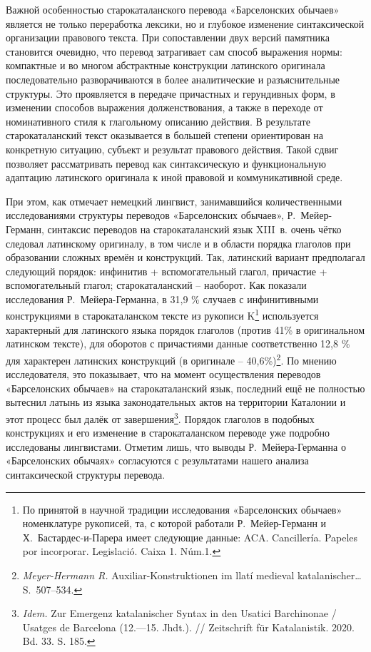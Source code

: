 Важной особенностью старокаталанского перевода «Барселонских обычаев» является не только переработка лексики, но и глубокое изменение синтаксической организации правового текста. При сопоставлении двух версий памятника становится очевидно, что перевод затрагивает сам способ выражения нормы: компактные и во многом абстрактные конструкции латинского оригинала последовательно разворачиваются в более аналитические и разъяснительные структуры. Это проявляется в передаче причастных и герундивных форм, в изменении способов выражения долженствования, а также в переходе от номинативного стиля к глагольному описанию действия. В результате старокаталанский текст оказывается в большей степени ориентирован на конкретную ситуацию, субъект и результат правового действия. Такой сдвиг позволяет рассматривать перевод как синтаксическую и функциональную адаптацию латинского оригинала к иной правовой и коммуникативной среде.

При этом, как отмечает немецкий лингвист, занимавшийся количественными исследованиями структуры переводов «Барселонских обычаев», Р.~Мейер-Германн, синтаксис переводов на старокаталанский язык XIII~в. очень чётко следовал латинскому оригиналу, в том числе и в области порядка глаголов при образовании сложных времён и конструкций. Так, латинский вариант предполагал следующий порядок: инфинитив + вспомогательный глагол, причастие + вспомогательный глагол; старокаталанский -- наоборот. Как показали исследования Р.~Мейера-Германна, в 31,9 \% случаев с инфинитивными конструкциями в старокаталанском тексте из рукописи K\footnote{По принятой в научной традиции исследования «Барселонских обычаев» номенклатуре рукописей, та, с которой работали Р.~Мейер-Германн и Х.~Бастардес-и-Парера имеет следующие данные: ACA. Cancillería. Papeles por incorporar. Legislació. Caixa 1. Núm.1.} используется характерный для латинского языка порядок глаголов (против 41\% в оригинальном латинском тексте), для оборотов с причастиями данные соответственно 12,8 \% для характерен латинских конструкций (в оригинале -- 40,6\%)\footnote{\emph{Meyer-Hermann R.} Auxiliar-Konstruktionen im llatí medieval katalanischer…S.~507--534.}. По мнению исследователя, это показывает, что на момент осуществления переводов «Барселонских обычаев» на старокаталанский язык, последний ещё не полностью вытеснил латынь из языка законодательных актов на территории Каталонии и этот процесс был далёк от завершения\footnote{\emph{Idem.} Zur Emergenz katalanischer Syntax in den Usatici Barchinonae / Usatges de Barcelona (12.---15. Jhdt.). // Zeitschrift für Katalanistik. 2020. Bd. 33. S. 185.}. Порядок глаголов в подобных конструкциях и его изменение в старокаталанском переводе уже подробно исследованы лингвистами. Отметим лишь, что выводы Р.~Мейера-Германна о «Барселонских обычаях» согласуются с результатами нашего анализа синтаксической структуры перевода.

